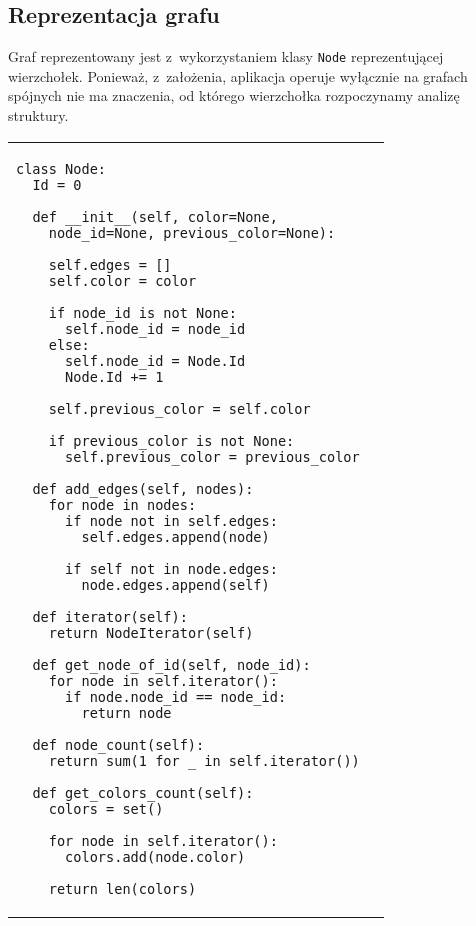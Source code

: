 \documentclass[a4paper,10pt]{article}
\begin{document}
\subsection*{Reprezentacja grafu}

Graf reprezentowany jest z~wykorzystaniem klasy \verb+Node+ reprezentującej wierzchołek. Ponieważ, z~założenia, aplikacja operuje wyłącznie na grafach spójnych nie ma znaczenia, od którego wierzchołka rozpoczynamy analizę struktury.

\noindent\begin{table}[ht!]
            \begin{tabular}{lr}
                \begin{minipage}[t]{0.55\textwidth}
                    \begin{verbatim}
class Node:
  Id = 0

  def __init__(self, color=None, 
    node_id=None, previous_color=None):
    
    self.edges = []
    self.color = color

    if node_id is not None:
      self.node_id = node_id
    else:
      self.node_id = Node.Id
      Node.Id += 1

    self.previous_color = self.color

    if previous_color is not None:
      self.previous_color = previous_color

  def add_edges(self, nodes):
    for node in nodes:
      if node not in self.edges:
        self.edges.append(node)

      if self not in node.edges:
        node.edges.append(self)

  def iterator(self):
    return NodeIterator(self)

  def get_node_of_id(self, node_id):
    for node in self.iterator():
      if node.node_id == node_id:
        return node

  def node_count(self):
    return sum(1 for _ in self.iterator())

  def get_colors_count(self):
    colors = set()

    for node in self.iterator():
      colors.add(node.color)

    return len(colors)
                    \end{verbatim}
                \end{minipage}
                
                &
        

\end{tabular}
\end{table}
\end{document}
